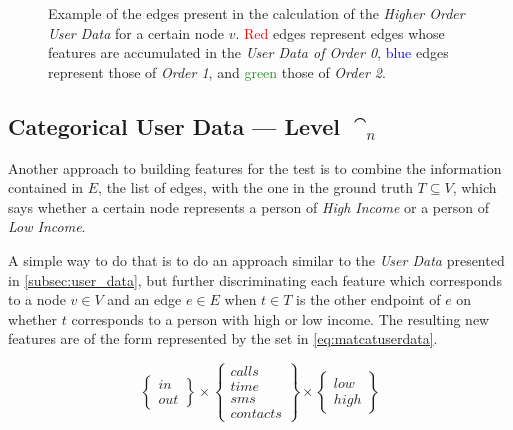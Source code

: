 
\begin{figure}
\centering
\framebox[\columnwidth]{%
	
}
\caption{Example of the edges present in the calculation of the \emph{Higher Order User Data} for a certain node $v$. \textcolor{red}{Red} edges represent edges whose features are accumulated in the \emph{User Data of Order 0}, \textcolor{blue}{blue} edges represent those of \emph{Order 1}, and \textcolor{ForestGreen}{green} those of \emph{Order 2}.}
\label{fig:higherorderuserdata}
\end{figure}

\subsection{Categorical User Data --- Level $\cat_n$}
\label{subsec:categoricaluserdata}

Another approach to building features for the test is to combine the information contained in $E$, the list of edges, with the one in the ground truth $T \subseteq V$, which says whether a certain node represents a person of \emph{High Income} or a person of \emph{Low Income}.



A simple way to do that is to do an approach similar to the \emph{User Data} presented in \cref{subsec:user_data}, but further discriminating each feature which corresponds to a node $v \in V$ and an edge $e \in E$ when $t \in T$ is the other endpoint of $e$ on whether $t$ corresponds to a person with high or low income. The resulting new features are of the form represented by the set in \cref{eq:matcatuserdata}.

\begin{equation}
\begin{Bmatrix} in \\ out \end{Bmatrix}
\times
\begin{Bmatrix} calls \\ time \\ sms \\ contacts \end{Bmatrix}
\times
\begin{Bmatrix} low \\ high \end{Bmatrix}
\label{eq:matcatuserdata}
\end{equation}

